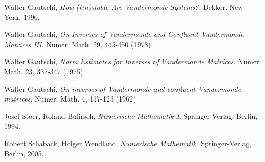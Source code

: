 \begin{thebibliography}{9}
    Walter Gautschi,
    \emph{How (Un)stable Are Vandermonde Systems?}.
    Dekker, New York,
    1990.

    Walter Gautschi,
    \emph{On Inverses of Vandermonde and Confluent Vandermonde Matrices III}.
    Numer. Math. 29, 445-450 (1978)

    Walter Gautschi,
    \emph{Norm Estimates for Inverses of Vandermonde Matrices}.
    Numer. Math. 23, 337-347 (1975)

    Walter Gautschi,
    \emph{On inverses of Vandermonde and confluent Vandermonde matrices}.
    Numer. Math. 4, 117-123 (1962)

    Josef Stoer, Roland Bulirsch,
    \emph{Numerische Mathematik I}.
    Springer-Verlag, Berlin,
    1994.

    Robert Schaback, Holger Wendland,
    \emph{Numerische Mathematik}.
    Springer-Verlag, Berlin,
    2005.
\end{thebibliography}
